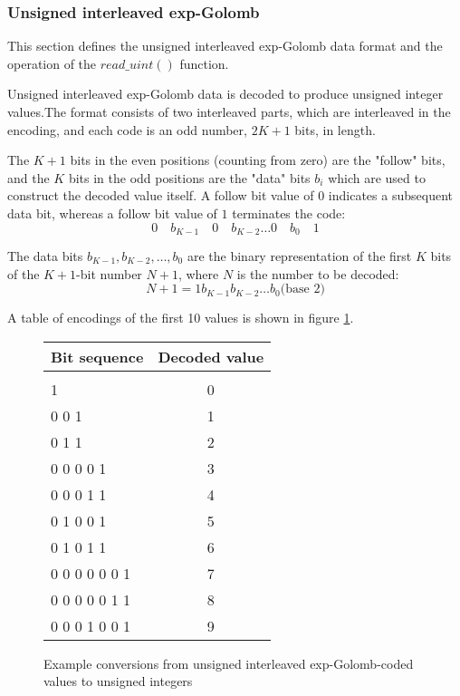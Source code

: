 \subsubsection{Unsigned interleaved exp-Golomb}
This section defines the unsigned interleaved exp-Golomb data format and the operation
of the $read\_uint()$ function. 

Unsigned interleaved exp-Golomb data is decoded to produce unsigned
 integer values.The format consists of two interleaved parts, which are interleaved
in the encoding, and each code is an odd number, $2K+1$ bits, in length.

The $K+1$ bits in the even positions (counting from zero) are the "follow" bits, and 
the $K$ bits in the odd positions are the "data" bits $b_i$ which are used to construct
the decoded value itself. A follow bit value of $0$ indicates a subsequent data bit,
whereas a follow bit value of $1$ terminates the code:
\begin{equation*}
0\quad b_{K-1}\quad 0\quad b_{K-2}\hdots 0\quad b_{0}\quad 1
\end{equation*}

The data bits $b_{K-1}, b_{K-2}, \hdots, b_0$ are the binary representation 
 of the first $K$ bits of the $K+1$-bit number 
$N+1$, where $N$ is the number to be decoded:
\begin{equation*}
N+1=1 b_{K-1} b_{K-2}\hdots b_0 \text{(base $2$)}
\end{equation*}

A table of encodings of the first 10 values is shown in figure \ref{uegolcodings}.

\begin{figure}[h]
\centering
\begin{tabular}{l|c}
Bit sequence & Decoded value \\
\hline\\
1                 &  0\\
0 0 1             &  1\\
0 1 1             &  2\\
0 0 0 0 1         &  3\\
0 0 0 1 1         &  4\\
0 1 0 0 1         &  5\\
0 1 0 1 1         &  6\\
0 0 0 0 0 0 1     &  7\\
0 0 0 0 0 1 1     &  8\\
0 0 0 1 0 0 1     &  9\\
\end{tabular}

\caption{Example conversions from unsigned interleaved exp-Golomb-coded 
values to unsigned integers \label{uegolcodings}}
\end{figure}


